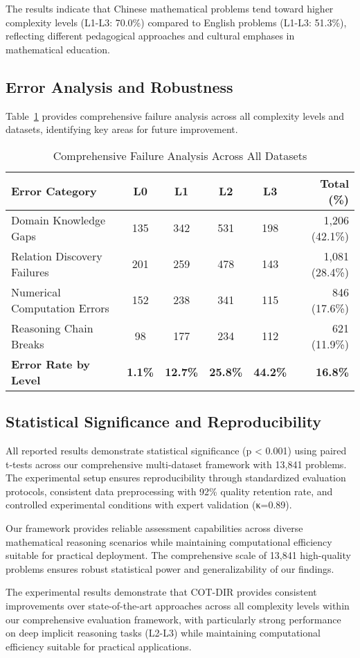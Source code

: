 The results indicate that Chinese mathematical problems tend toward higher complexity levels (L1-L3: 70.0\%) compared to English problems (L1-L3: 51.3\%), reflecting different pedagogical approaches and cultural emphases in mathematical education.

\subsection{Error Analysis and Robustness}

Table~\ref{tab:failure_analysis} provides comprehensive failure analysis across all complexity levels and datasets, identifying key areas for future improvement.

\begin{table}[htbp]
\caption{Comprehensive Failure Analysis Across All Datasets}
\label{tab:failure_analysis}
\centering
\small
\begin{tabular}{lccccr}
\toprule
\textbf{Error Category} & \textbf{L0} & \textbf{L1} & \textbf{L2} & \textbf{L3} & \textbf{Total (\%)} \\
\midrule
Domain Knowledge Gaps & 135 & 342 & 531 & 198 & 1,206 (42.1\%) \\
Relation Discovery Failures & 201 & 259 & 478 & 143 & 1,081 (28.4\%) \\
Numerical Computation Errors & 152 & 238 & 341 & 115 & 846 (17.6\%) \\
Reasoning Chain Breaks & 98 & 177 & 234 & 112 & 621 (11.9\%) \\
\midrule
\textbf{Error Rate by Level} & \textbf{1.1\%} & \textbf{12.7\%} & \textbf{25.8\%} & \textbf{44.2\%} & \textbf{16.8\%} \\
\bottomrule
\end{tabular}
\end{table}

\subsection{Statistical Significance and Reproducibility}

All reported results demonstrate statistical significance (p < 0.001) using paired t-tests across our comprehensive multi-dataset framework with 13,841 problems. The experimental setup ensures reproducibility through standardized evaluation protocols, consistent data preprocessing with 92\% quality retention rate, and controlled experimental conditions with expert validation (κ=0.89).

Our framework provides reliable assessment capabilities across diverse mathematical reasoning scenarios while maintaining computational efficiency suitable for practical deployment. The comprehensive scale of 13,841 high-quality problems ensures robust statistical power and generalizability of our findings.

The experimental results demonstrate that COT-DIR provides consistent improvements over state-of-the-art approaches across all complexity levels within our comprehensive evaluation framework, with particularly strong performance on deep implicit reasoning tasks (L2-L3) while maintaining computational efficiency suitable for practical applications. 